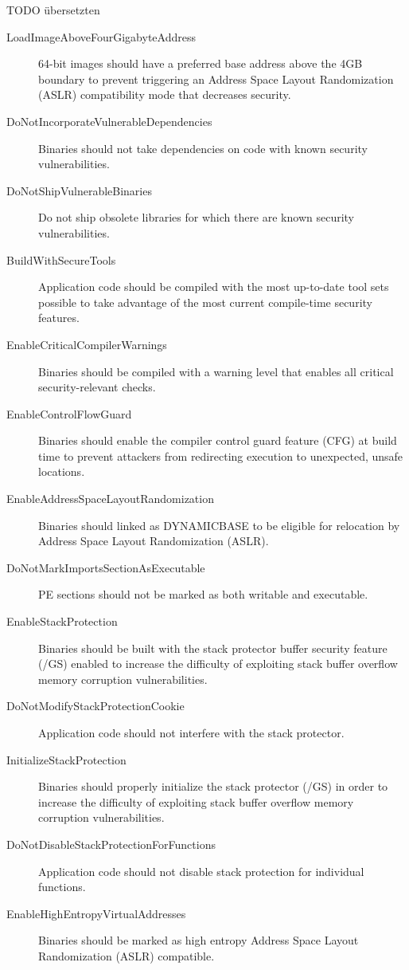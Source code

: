 TODO übersetzten
\begin{description}
	\item[LoadImageAboveFourGigabyteAddress] 64-bit images should have a preferred base address above the 4GB boundary to prevent triggering an Address Space Layout Randomization (ASLR) compatibility mode that decreases security.
	\item[DoNotIncorporateVulnerableDependencies] Binaries should not take dependencies on code with known security vulnerabilities.
	\item[DoNotShipVulnerableBinaries] Do not ship obsolete libraries for which there are known security vulnerabilities.
	\item[BuildWithSecureTools] Application code should be compiled with the most up-to-date tool sets possible to take advantage of the most current compile-time security features.
	\item[EnableCriticalCompilerWarnings] Binaries should be compiled with a warning level that enables all critical security-relevant checks.
	\item[EnableControlFlowGuard] Binaries should enable the compiler control guard feature (CFG) at build time to prevent attackers from redirecting execution to unexpected, unsafe locations.
	\item[EnableAddressSpaceLayoutRandomization] Binaries should linked as DYNAMICBASE to be eligible for relocation by Address Space Layout Randomization (ASLR).
	\item[DoNotMarkImportsSectionAsExecutable] PE sections should not be marked as both writable and executable.
	\item[EnableStackProtection] Binaries should be built with the stack protector buffer security feature (/GS) enabled to increase the difficulty of exploiting stack buffer overflow memory corruption vulnerabilities.
	\item[DoNotModifyStackProtectionCookie] Application code should not interfere with the stack protector.
	\item[InitializeStackProtection] Binaries should properly initialize the stack protector (/GS) in order to increase the difficulty of exploiting stack buffer overflow memory corruption vulnerabilities.
	\item[DoNotDisableStackProtectionForFunctions] Application code should not disable stack protection for individual functions.
	\item[EnableHighEntropyVirtualAddresses] Binaries should be marked as high entropy Address Space Layout Randomization (ASLR) compatible.

\end{description}
